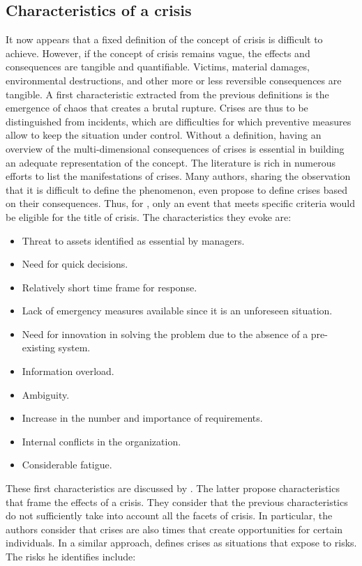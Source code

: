 \subsection{Characteristics of a crisis}
It now appears that a fixed definition of the concept of crisis is difficult to achieve.
However, if the concept of crisis remains vague, the effects and consequences are tangible and quantifiable.
Victims, material damages, environmental destructions, and other more or less reversible consequences are tangible.
A first characteristic extracted from the previous definitions is the emergence of chaos that creates a brutal rupture.
Crises are thus to be distinguished from incidents, which are difficulties for which preventive measures allow to keep the situation under control.
Without a definition, having an overview of the multi-dimensional consequences of crises is essential in building an adequate representation of the concept.
The literature is rich in numerous efforts to list the manifestations of crises.
Many authors, sharing the observation that it is difficult to define the phenomenon, even propose to define crises based on their consequences.
Thus, for \textcite{milburnManagementCrisis1972}, only an event that meets specific criteria would be eligible for the title of crisis.
The characteristics they evoke are:

\begin{itemize}
    \item Threat to assets identified as essential by managers.
    \item Need for quick decisions.
    \item Relatively short time frame for response.
    \item Lack of emergency measures available since it is an unforeseen situation.
    \item Need for innovation in solving the problem due to the absence of a pre-existing system.
    \item Information overload.
    \item Ambiguity.
    \item Increase in the number and importance of requirements.
    \item Internal conflicts in the organization.
    \item Considerable fatigue.
\end{itemize}

These first characteristics are discussed by \textcite{rosenthalCrisisDecisionMakingNetherlands1986}.
The latter propose characteristics that frame the effects of a crisis.
They consider that the previous characteristics do not sufficiently take into account all the facets of crisis.
In particular, the authors consider that crises are also times that create opportunities for certain individuals.
In a similar approach, \textcite{finkCrisisManagementPlanning1986} defines crises as situations that expose to risks.
The risks he identifies include:

